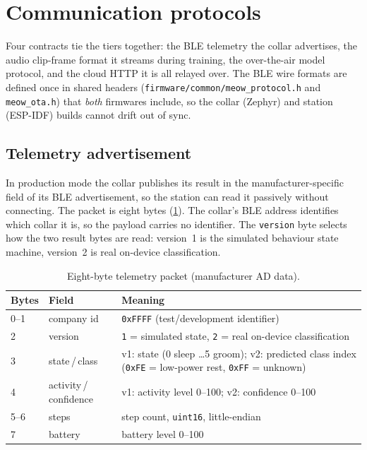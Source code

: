 \section{Communication protocols}
\label{sec:protocols}

Four contracts tie the tiers together: the BLE telemetry the collar advertises, the audio clip-frame
format it streams during training, the over-the-air model protocol, and the cloud HTTP it is all
relayed over. The BLE wire formats are defined once in shared headers
(\texttt{firmware/common/meow\_protocol.h} and \texttt{meow\_ota.h}) that \emph{both} firmwares
include, so the collar (Zephyr) and station (ESP-IDF) builds cannot drift out of sync.

\subsection{Telemetry advertisement}

In production mode the collar publishes its result in the manufacturer-specific field of its BLE
advertisement, so the station can read it passively without connecting. The packet is eight bytes
(\cref{tab:telemetry}). The collar's BLE address identifies which collar it is, so the payload carries
no identifier. The \texttt{version} byte selects how the two result bytes are read: version~1 is the
simulated behaviour state machine, version~2 is real on-device classification.

\begin{table}[ht]
  \centering
  \caption{Eight-byte telemetry packet (manufacturer AD data).}
  \label{tab:telemetry}
  \begin{tabularx}{\textwidth}{@{}llX@{}}
    \toprule
    \textbf{Bytes} & \textbf{Field} & \textbf{Meaning} \\
    \midrule
    0--1 & company id   & \texttt{0xFFFF} (test/development identifier) \\
    2    & version      & \texttt{1} = simulated state, \texttt{2} = real on-device classification \\
    3    & state\,/\,class & v1: state (0 sleep \dots 5 groom); v2: predicted class index (\texttt{0xFE} = low-power rest, \texttt{0xFF} = unknown) \\
    4    & activity\,/\,confidence & v1: activity level 0--100; v2: confidence 0--100 \\
    5--6 & steps        & step count, \texttt{uint16}, little-endian \\
    7    & battery      & battery level 0--100 \\
    \bottomrule
  \end{tabularx}
\end{table}


